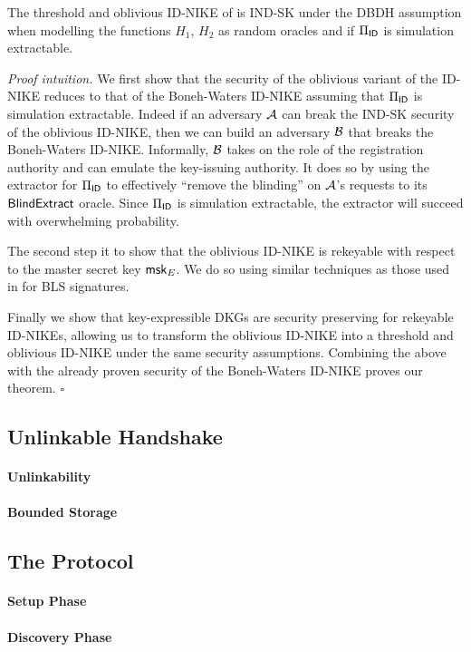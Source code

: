 	\begin{theorem}
	\label{theorem:threshold_oblivious_idnike_security}
		The threshold and oblivious ID-NIKE of  is IND-SK under the DBDH assumption when modelling the functions $H_1$, $H_2$ as random oracles and if $\Pi_{\mathsf{ID}}$ is simulation extractable.
	\end{theorem}
	
	\noindent \textit{Proof intuition.} We first show that the security of the oblivious variant of the ID-NIKE reduces to that of the Boneh-Waters ID-NIKE assuming that $\Pi_{\mathsf{ID}}$ is simulation extractable. Indeed if an adversary $\mathcal{A}$ can break the IND-SK security of the oblivious ID-NIKE, then we can build an adversary $\mathcal{B}$ that breaks the Boneh-Waters ID-NIKE. Informally, $\mathcal{B}$ takes on the role of the registration authority and can emulate the key-issuing authority. It does so by using the extractor for $\Pi_{\mathsf{ID}}$ to effectively ``remove the blinding'' on $\mathcal{A}$'s requests to its $\mathsf{BlindExtract}$ oracle. Since $\Pi_{\mathsf{ID}}$ is simulation extractable, the extractor will succeed with overwhelming probability.
		
	The second step it to show that the oblivious ID-NIKE is rekeyable with respect to the master secret key $\mathsf{msk}_E$. We do so using similar techniques as those used in \cite{gurkan2021aggregatable} for BLS signatures. 
	
	Finally we show that key-expressible DKGs are security preserving for rekeyable ID-NIKEs, allowing us to transform the oblivious ID-NIKE into a threshold and oblivious ID-NIKE under the same security assumptions. Combining the above with the already proven security of the Boneh-Waters ID-NIKE proves our theorem. $\square$
	
	\subsection{Unlinkable Handshake}
	
	\paragraph{Unlinkability}
	
	\paragraph{Bounded Storage}
	
	\subsection{The \sysname Protocol}
	
	\paragraph{Setup Phase}
	
	\paragraph{Discovery Phase}
	
	
	
	
	
	
	
	
	
	
	